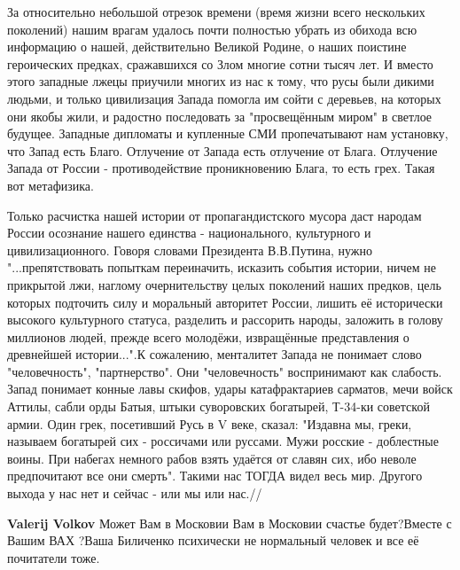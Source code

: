 \begin{itemize}
За относительно небольшой отрезок времени (время жизни всего нескольких
поколений) нашим врагам удалось почти полностью убрать из обихода всю
информацию о нашей, действительно Великой Родине, о наших поистине героических
предках, сражавшихся со Злом многие сотни тысяч лет. И вместо этого западные
лжецы приучили многих из нас к тому, что русы были дикими людьми, и только
цивилизация Запада помогла им сойти с деревьев, на которых они якобы жили, и
радостно последовать за "просвещённым миром" в светлое будущее. Западные
дипломаты и купленные СМИ пропечатывают нам установку, что Запад есть Благо.
Отлучение от Запада есть отлучение от Блага. Отлучение Запада от России -
противодействие проникновению Блага, то есть грех. Такая вот метафизика.

Только расчистка нашей истории от пропагандистского мусора даст народам России
осознание нашего единства - национального, культурного и цивилизационного.
Говоря словами Президента В.В.Путина, нужно "...препятствовать попыткам
переиначить, исказить события истории, ничем не прикрытой лжи, наглому
очернительству целых поколений наших предков, цель которых подточить силу и
моральный авторитет России, лишить её исторически высокого культурного статуса,
разделить и рассорить народы, заложить в голову миллионов людей, прежде всего
молодёжи, извращённые представления о древнейшей истории...".К сожалению,
менталитет Запада не понимает слово "человечность", "партнерство". Они
"человечность" воспринимают как слабость. Запад понимает конные лавы скифов,
удары катафрактариев сарматов, мечи войск Аттилы, сабли орды Батыя, штыки
суворовских богатырей, Т-34-ки советской армии. Один грек, посетивший Русь в V
веке, сказал: "Издавна мы, греки, называем богатырей сих - россичами или
руссами. Мужи росские - доблестные воины. При набегах немного рабов взять
удаётся от славян сих, ибо неволе предпочитают все они смерть". Такими нас
ТОГДА видел весь мир. Другого выхода у нас нет и сейчас - или мы или нас.//

\begin{itemize}
 
\textbf{Valerij Volkov} Может Вам в Московии Вам в Московии счастье будет?Вместе с Вашим ВАХ ?Ваша Биличенко психически не нормальный человек и все её почитатели тоже.


\end{itemize}
\end{itemize}
